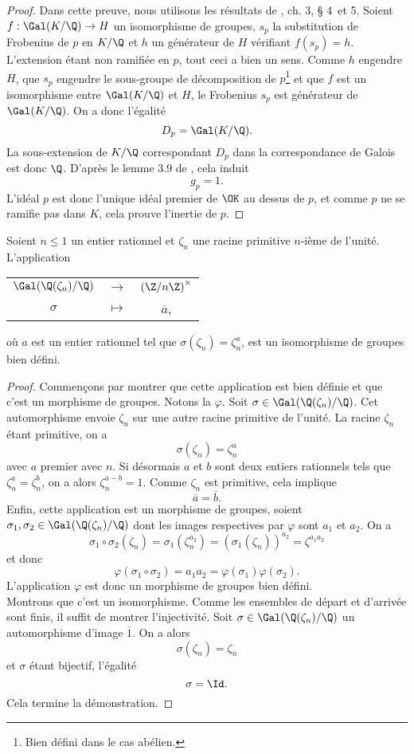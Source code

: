 \begin{proof}
	Dans cette preuve, nous utilisons les résultats de \cite{Kraus}, ch. 3, § 4 et 5. Soient $f : \Gal(K/\Q) \to H$ un isomorphisme de groupes, $s_p$ la substitution de Frobenius de $p$ en $K/\Q$ et $h$ un générateur de $H$ vérifiant $f(s_p) = h$. L'extension étant non ramifiée en $p$, tout ceci a bien un sens. Comme $h$ engendre $H$, que $s_p$ engendre le sous-groupe de décomposition de $p$\footnote{Bien défini dans le cas abélien.} et que $f$ est un isomorphisme entre $\Gal(K/\Q)$ et $H$, le Frobenius $s_p$ est générateur de $\Gal(K/\Q)$. On a donc l'égalité \[D_p = \Gal(K/\Q).\] La sous-extension de $K/\Q$ correspondant $D_p$ dans la correspondance de Galois est donc $\Q$. D'après le lemme 3.9 de \cite{Kraus}, cela induit \[g_p = 1.\] L'idéal $p$ est donc l'unique idéal premier de $\OK$ au dessus de $p$, et comme $p$ ne se ramifie pas dans $K$, cela prouve l'inertie de $p$.

\end{proof}

\begin{lemme}\label{iso-Z/nZ*}
	Soient $n \leq 1$ un entier rationnel et $\zeta_n$ une racine primitive $n$-ième de l'unité. L'application 
\begin{center}
	\begin{tabular}{ccc}
		$\Gal(\Q(\zeta_n)/\Q)$ & $\longrightarrow$ & $\left(\Z/n\Z\right)^\times$ \\
		$\sigma$	& $\longmapsto$ & $\overline{a}$,
	\end{tabular}
\end{center}
où $a$ est un entier rationnel tel que $\sigma(\zeta_n) = \zeta_n^a$, est un isomorphisme de groupes bien défini.
\end{lemme}

\begin{proof}
	Commençons par montrer que cette application est bien définie et que c'est un morphisme de groupes. Notons la $\varphi$. Soit $\sigma\in \Gal(\Q(\zeta_n)/\Q)$. Cet automorphisme envoie $\zeta_n$ sur une autre racine primitive de l'unité. La racine $\zeta_n$ étant primitive,  on a \[\sigma(\zeta_n) = \zeta_n^a\] avec $a$ premier avec $n$. Si désormais $a$ et $b$ sont deux entiers rationnels tels que $\zeta_n^a = \zeta_n^b$, on a alors $\zeta_n^{a-b} = 1$. Comme $\zeta_n$ est primitive, cela implique \[\overline{a} = \overline{b}.\] Enfin, cette application est un morphisme de groupes, soient $\sigma_1, \sigma_2 \in \Gal(\Q(\zeta_n)/\Q)$ dont les images respectives par $\varphi$ sont $a_1$ et $a_2$. On a \[\sigma_1\circ \sigma_2(\zeta_n) = \sigma_1(\zeta_n^{a_2}) = (\sigma_1(\zeta_n))^{a_2} = \zeta^{a_1 a_2}\] et donc \[\varphi(\sigma_1\circ\sigma_2) = a_1 a_2 = \varphi(\sigma_1)\varphi(\sigma_2).\] L'application $\varphi$ est donc un morphisme de groupes bien défini. \\

	Montrons que c'est un isomorphisme. Comme les ensembles de départ et d'arrivée sont finis, il suffit de montrer l'injectivité. Soit $\sigma\in \Gal(\Q(\zeta_n)/\Q)$ un automorphisme d'image $\overline{1}$. On a alors \[\sigma(\zeta_n) = \zeta_n\] et $\sigma$ étant bijectif, l'égalité \[\sigma = \Id.\] Cela termine la démonstration.
\end{proof}


